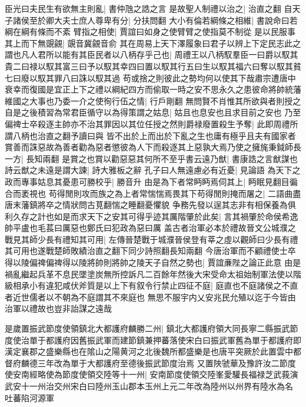 臣光曰夫民生有欲無主則亂|{
	書仲虺之誥之言}
是故聖人制禮以治之|{
	治直之翻}
自天子諸侯至於卿大夫士庶人尊卑有分|{
	分扶問翻}
大小有倫若綱條之相維|{
	書說命曰若綱在綱有條而不紊}
臂指之相使|{
	賈誼曰如身之使臂臂之使指莫不制從}
是以民服事其上而下無覬覦|{
	覬音冀覦音俞}
其在周易上天下澤履象曰君子以辨上下定民志此之謂也凡人君所以能有其臣民者以八柄存乎己也|{
	周禮王以八柄馭羣臣一曰爵以馭其貴二曰禄以馭其富三曰予以馭其幸四曰置以馭其行五曰生以馭其福六曰奪以馭其貧七曰廢以馭其罪八曰誅以馭其過}
苟或捨之則彼此之勢均何以使其下哉肅宗遭唐中衰幸而復國是宜正上下之禮以綱紀四方而偷取一時之安不思永久之患彼命將帥統藩維國之大事也乃委一介之使徇行伍之情|{
	行戶剛翻}
無問賢不肖惟其所欲與者則授之自是之後積習為常君臣循守以為得策謂之姑息|{
	姑且也息安也且求目前之安也}
乃至偏禆士卒殺逐主帥亦不治其罪因以其位任授之然則爵禄廢置殺生予奪|{
	此即周禮所謂八柄也治直之翻予讀曰與}
皆不出於上而出於下亂之生也庸有極乎且夫有國家者賞善而誅惡故為善者勸為惡者懲彼為人下而殺逐其上惡孰大焉乃使之擁旄秉鉞師長一方|{
	長知兩翻}
是賞之也賞以勸惡惡其何所不至乎書云遠乃猷|{
	書康誥之言猷謀也}
詩云猷之未遠是謂大諫|{
	詩大雅板之辭}
孔子曰人無遠慮必有近憂|{
	見論語}
為天下之政而專事姑息其憂患可勝校乎|{
	勝音升}
由是為下者常眄眄焉伺其上|{
	眄眠見翻目徧合而袤視也}
苟得閒則攻而族之為上者常惴惴焉畏其下苟得閒則掩而屠之|{
	二語曲盡唐末藩鎮將卒之情狀問古莧翻惴之睡翻憂懼貌}
争務先發以逞其志非有相保養為俱利久存之計也如是而求天下之安其可得乎迹其厲階肇於此矣|{
	言其禍肇於命侯希逸帥平盧也毛萇曰厲惡也鄭氏曰犯政為惡曰厲}
盖古者治軍必本於禮故晉文公城濮之戰見其師少長有禮知其可用|{
	左傳晉楚戰于城濮晉侯登有莘之虛以觀師曰少長有禮其可用也遂戰楚師敗績治直之翻下同少詩照翻長知兩翻}
今唐治軍而不顧禮使士卒得以陵偏禆偏禆得以陵將帥則將帥之陵天子自然之勢也|{
	賈誼亷陛之論正此意}
由是禍亂繼起兵革不息民墜塗炭無所控訴凡二百餘年然後大宋受命太祖始制軍法使以階級相承小有違犯咸伏斧質是以上下有叙令行禁止四征不庭|{
	庭直也不庭諸侯之不直者近世儒者以不朝為不庭謂其不來庭也}
無思不服宇内乂安兆民允殖以迄于今皆由治軍以禮故也豈非詒謀之遠哉

是歲置振武節度使領鎮北大都護府麟勝二州|{
	鎮北大都護府領大同長寧二縣振武節度使治單于都護府因舊振武軍而建節鎮兼押蕃落使宋白曰振武軍舊為單于都護府即漢定襄郡之盛樂縣也在隂山之陽黄河之北後魏所都盛樂是也唐平突厥於此置雲中都督府麟德三年改為單于大都護府至德後振武節度治焉}
又置陜虢華及豫許汝二節度使安南經略使為節度使領交陸等十一州|{
	安南節度使領交陸峯愛驩長福禄芝武莪演武安十一州治交州宋白曰陸州玉山郡本玉州上元二年改為陸州以州界有陸水為名}
吐蕃陷河源軍

